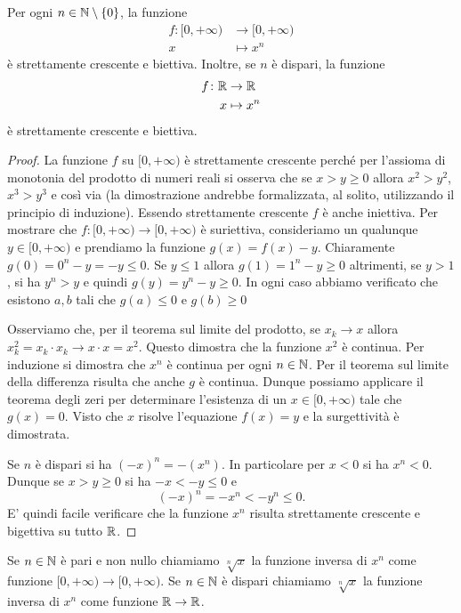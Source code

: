 \begin{theorem}
\mymark{*}
Per ogni $n\in \mathbb N\setminus\{0\}$, la funzione
\begin{align*}
  f\colon [0,+\infty) &\to [0,+\infty)\\
   x &\mapsto x^n
\end{align*}
è strettamente crescente e biettiva.
Inoltre, se $n$ è dispari, la funzione
\begin{align*}
  f\colon \mathbb R & \to \mathbb R\\
    x &\mapsto x^n
\end{align*}
è strettamente crescente e biettiva.
\end{theorem}
%
\begin{proof}
La funzione $f$ su $[0,+\infty)$ è strettamente crescente perché
per l'assioma di monotonia del prodotto di numeri reali si
osserva che
se $x>y\ge 0$ allora $x^2 > y^2$, $x^3 > y^3$ e così via
(la dimostrazione andrebbe formalizzata, al solito, utilizzando il principio di
induzione).
Essendo strettamente crescente $f$ è anche iniettiva.
Per mostrare che $f\colon [0,+\infty) \to [0,+\infty)$ è suriettiva, consideriamo
un qualunque $y\in[0,+\infty)$ e prendiamo la funzione $g(x)=f(x)-y$.
Chiaramente $g(0) = 0^n - y = -y \le 0$. Se $y\le 1$ allora $g(1) = 1^n - y \ge 0$
altrimenti, se $y>1$, si ha $y^n>y$ e quindi $g(y) = y^n-y \ge 0$.
In ogni caso abbiamo verificato che esistono $a,b$ tali che $g(a)\le 0$ e $g(b)\ge 0$

Osserviamo che, per il teorema sul limite del prodotto,
se $x_k \to x$ allora $x_k^2 = x_k\cdot x_k \to x\cdot x = x^2$.
Questo dimostra che la funzione $x^2$ è continua.
Per induzione si dimostra che $x^n$ è continua per ogni $n\in \mathbb N$.
Per il teorema sul limite della differenza risulta che anche $g$ è
continua.
Dunque possiamo applicare il teorema degli zeri
per determinare l'esistenza di un $x\in[0,+\infty)$ tale che $g(x)=0$.
Visto che $x$ risolve l'equazione $f(x)=y$ e la surgettività è dimostrata.

Se $n$ è dispari si ha $(-x)^n = -(x^n)$.
In particolare per $x<0$ si ha $x^n<0$. Dunque se $x> y \ge 0$ si
ha $-x < -y \le 0$ e
\[
  (-x)^n = -x^n < -y^n \le 0.
\]
E' quindi facile verificare che la funzione $x^n$
risulta strettamente crescente e bigettiva su tutto $\mathbb R$.
\end{proof}

\begin{definition}
\mymark{***}
Se $n\in \mathbb N$ è pari e non nullo
chiamiamo $\sqrt[n]{x}$ la funzione
inversa di $x^n$ come funzione $[0,+\infty)\to [0,+\infty)$.
Se $n\in \mathbb N$ è dispari chiamiamo $\sqrt[n]{x}$
la funzione inversa di $x^n$ come funzione $\mathbb R \to \mathbb R$.
\end{definition}

